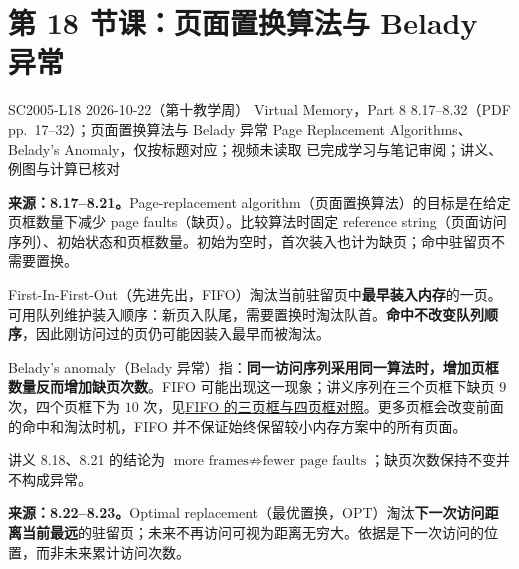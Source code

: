 \begingroup
\renewcommand{\recordid}[1]{}
\renewcommand{\relatedexercise}[2]{\hyperref[exercise:#1]{#2}}
\section{第 18 节课：页面置换算法与 Belady 异常}
\label{lecture:SC2005-L18}

\lecturemeta
  {SC2005-L18}
  {2026-10-22（第十教学周）}
  {Virtual Memory，Part 8}
  {8.17--8.32（PDF pp.~17--32）；页面置换算法与 Belady 异常}
  {Page Replacement Algorithms、Belady's Anomaly，仅按标题对应；视频未读取}
  {已完成学习与笔记审阅；讲义、例图与计算已核对}

\linespread{1.15}\selectfont
\setlength{\parskip}{0.4em}



\textbf{来源：8.17--8.21。}Page-replacement algorithm（页面置换算法）的目标是在给定页框数量下减少 page faults（缺页）。比较算法时固定 reference string（页面访问序列）、初始状态和页框数量。初始为空时，首次装入也计为缺页；命中驻留页不需要置换。

First-In-First-Out（先进先出，FIFO）淘汰当前驻留页中\textbf{最早装入内存}的一页。可用队列维护装入顺序：新页入队尾，需要置换时淘汰队首。\textbf{命中不改变队列顺序}，因此刚访问过的页仍可能因装入最早而被淘汰。

Belady's anomaly（Belady 异常）指：\textbf{同一访问序列采用同一算法时，增加页框数量反而增加缺页次数}。FIFO 可能出现这一现象；讲义序列在三个页框下缺页 $9$ 次，四个页框下为 $10$ 次，见\relatedexercise{SC2005-L18-E01}{FIFO 的三页框与四页框对照}。更多页框会改变前面的命中和淘汰时机，FIFO 并不保证始终保留较小内存方案中的所有页面。

讲义 8.18、8.21 的结论为 $\text{more frames}\not\Rightarrow\text{fewer page faults}$；缺页次数保持不变并不构成异常。


\textbf{来源：8.22--8.23。}Optimal replacement（最优置换，OPT）淘汰\textbf{下一次访问距离当前最远}的驻留页；未来不再访问可视为距离无穷大。依据是下一次访问的位置，而非未来累计访问次数。

